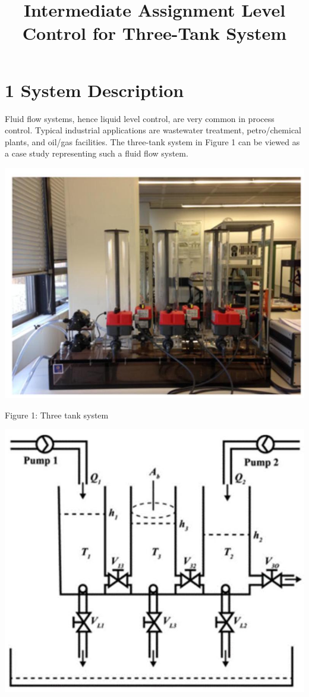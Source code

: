 \documentclass[10pt]{article}
\title{Intermediate Assignment 
 Level Control for Three-Tank System }
\author{}
\date{}
\begin{document}
\maketitle
\section*{1 System Description}
Fluid flow systems, hence liquid level control, are very common in process control. Typical industrial applications are wastewater treatment, petro/chemical plants, and oil/gas facilities. The three-tank system in Figure 1 can be viewed as a case study representing such a fluid flow system.

\begin{center}
\includegraphics[max width=\textwidth]{2023_11_30_1daa78c814c553452d7bg-1(1)}
\end{center}

Figure 1: Three tank system

\begin{center}
\includegraphics[max width=\textwidth]{2023_11_30_1daa78c814c553452d7bg-1}
\end{center}
\end{document}
